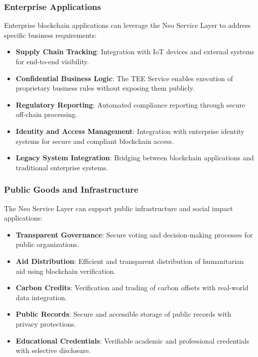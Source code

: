 \documentclass{article}
\begin{document}
\subsubsection{Enterprise Applications}
\label{subsubsec:enterprise}

Enterprise blockchain applications can leverage the Neo Service Layer to address specific business requirements:

\begin{itemize}
    \item \textbf{Supply Chain Tracking}: Integration with IoT devices and external systems for end-to-end visibility.
    
    \item \textbf{Confidential Business Logic}: The TEE Service enables execution of proprietary business rules without exposing them publicly.
    
    \item \textbf{Regulatory Reporting}: Automated compliance reporting through secure off-chain processing.
    
    \item \textbf{Identity and Access Management}: Integration with enterprise identity systems for secure and compliant blockchain access.
    
    \item \textbf{Legacy System Integration}: Bridging between blockchain applications and traditional enterprise systems.
\end{itemize}

\subsubsection{Public Goods and Infrastructure}
\label{subsubsec:public-goods}

The Neo Service Layer can support public infrastructure and social impact applications:

\begin{itemize}
    \item \textbf{Transparent Governance}: Secure voting and decision-making processes for public organizations.
    
    \item \textbf{Aid Distribution}: Efficient and transparent distribution of humanitarian aid using blockchain verification.
    
    \item \textbf{Carbon Credits}: Verification and trading of carbon offsets with real-world data integration.
    
    \item \textbf{Public Records}: Secure and accessible storage of public records with privacy protections.
    
    \item \textbf{Educational Credentials}: Verifiable academic and professional credentials with selective disclosure.
\end{itemize}
\end{document}
